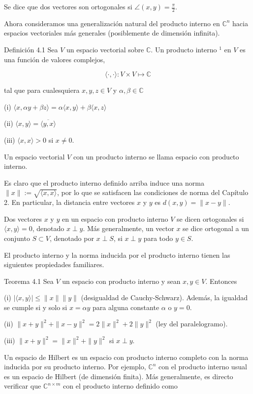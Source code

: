 Se dice que dos vectores son ortogonales si $\angle(x, y)=\frac{\pi}{2}$.

Ahora consideramos una generalización natural del producto interno en $\mathbb{C}^{n}$ hacia espacios vectoriales más generales (posiblemente de dimensión infinita).

Definición 4.1 Sea $V$ un espacio vectorial sobre $\mathbb{C}$. Un producto interno ${ }^{1}$ en $V$ es una función de valores complejos,

$$
\langle\cdot, \cdot\rangle: V \times V \longmapsto \mathbb{C}
$$

tal que para cualesquiera $x, y, z \in V$ y $\alpha, \beta \in \mathbb{C}$

(i) $\langle x, \alpha y+\beta z\rangle=\alpha\langle x, y\rangle+\beta\langle x, z\rangle$

(ii) $\langle x, y\rangle=\overline{\langle y, x\rangle}$

(iii) $\langle x, x\rangle>0$ si $x \neq 0$.

Un espacio vectorial $V$ con un producto interno se llama espacio con producto interno.

Es claro que el producto interno definido arriba induce una norma $\|x\|:=\sqrt{\langle x, x\rangle}$, por lo que se satisfacen las condiciones de norma del Capítulo 2. En particular, la distancia entre vectores $x$ y $y$ es $d(x, y)=\|x-y\|$.

Dos vectores $x$ y $y$ en un espacio con producto interno $V$ se dicen ortogonales si $\langle x, y\rangle=0$, denotado $x \perp y$. Más generalmente, un vector $x$ se dice ortogonal a un conjunto $S \subset V$, denotado por $x \perp S$, si $x \perp y$ para todo $y \in S$.

El producto interno y la norma inducida por el producto interno tienen las siguientes propiedades familiares.

Teorema 4.1 Sea $V$ un espacio con producto interno y sean $x, y \in V$. Entonces

(i) $|\langle x, y\rangle| \leq\|x\|\|y\|$ (desigualdad de Cauchy-Schwarz). Además, la igualdad se cumple si y solo si $x=\alpha y$ para alguna constante $\alpha$ o $y=0$.

(ii) $\|x+y\|^{2}+\|x-y\|^{2}=2\|x\|^{2}+2\|y\|^{2}$ (ley del paralelogramo).

(iii) $\|x+y\|^{2}=\|x\|^{2}+\|y\|^{2}$ si $x \perp y$.

Un espacio de Hilbert es un espacio con producto interno completo con la norma inducida por su producto interno. Por ejemplo, $\mathbb{C}^{n}$ con el producto interno usual es un espacio de Hilbert (de dimensión finita). Más generalmente, es directo verificar que $\mathbb{C}^{n \times m}$ con el producto interno definido como

